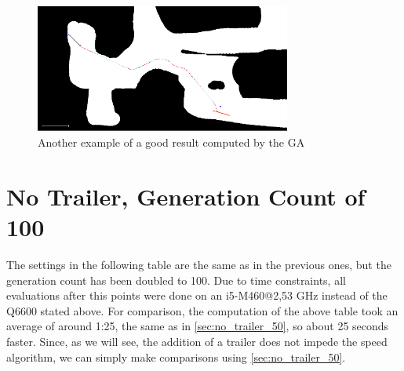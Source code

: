 \begin{figure}[b]
\centering
\includegraphics[width=0.75\textwidth]{./Chapters/Figures/example_good_path2.png}
\caption{Another example of a good result computed by the GA\label{pic:example_good_path2}}
\end{figure}


\section{No Trailer, Generation Count of 100}
\label{sec:no_trailer_100}

The settings in the following table are the same as in the previous ones, but the generation count has been doubled to 100.
Due to time constraints, all evaluations after this points were done on an i5-M460@2,53 GHz instead of the Q6600 stated above. For comparison, the computation of the above table took an average of around 1:25, the same as in \ref{sec:no_trailer_50}, so about 25 seconds faster. Since, as we will see, the addition of a trailer does not impede the speed algorithm, we can simply make comparisons using \ref{sec:no_trailer_50}.

